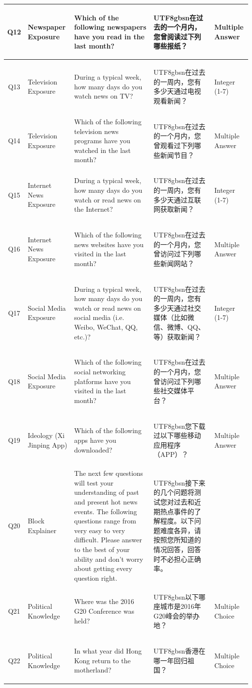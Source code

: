 \documentclass[11pt]{article}
\newcommand{\zh}[1]{\begin{CJK*}{UTF8}{gbsn}#1\end{CJK*}}
\begin{document}
\begin{table}[H]
{\begin{tabular}{|c|p{}|p{}|p{}|p{}|}
        Q12 & Newspaper Exposure & Which of the following newspapers have you read in the last month? & \zh{在过去的一个月内，您曾阅读过下列哪些报纸？} & Multiple Answer \\\hline
        Q13 & Television Exposure & During a typical week, how many days do you watch news on TV? & \zh{在过去的一周内，您有多少天通过电视观看新闻？} & Integer (1-7) \\\hline
        Q14 & Television Exposure & Which of the following television news programs have you watched in the last month? & \zh{在过去的一个月内，您曾观看过下列哪些新闻节目？} & Multiple Answer \\\hline
        Q15 & Internet News Exposure & During a typical week, how many days do you watch or read news on the Internet? & \zh{在过去的一周内，您有多少天通过互联网获取新闻？} & Integer (1-7) \\\hline
        Q16 & Internet News Exposure & Which of the following news websites have you visited in the last month? & \zh{在过去的一个月内，您曾访问过下列哪些新闻网站？} & Multiple Answer \\\hline
        Q17 & Social Media Exposure & During a typical week, how many days do you watch or read news on social media (i.e. Weibo, WeChat, QQ, etc.)? & \zh{在过去的一周内，您有多少天通过社交媒体（比如微信、微博、QQ、等）获取新闻？} & Integer (1-7) \\\hline
        Q18 & Social Media Exposure & Which of the following social networking platforms have you visited in the last month? & \zh{在过去的一个月内，您曾访问过下列哪些社交媒体平台？} & Multiple Answer \\\hline
        Q19 & Ideology (Xi Jinping App) & Which of the following apps have you downloaded? & \zh{您下载过以下哪些移动应用程序（APP）？} & Multiple Answer \\\hline
        Q20 & Block Explainer & The next few questions will test your understanding of past and present hot news events. The following questions range from very easy to very difficult. Please answer to the best of your ability and don't worry about getting every question right. & \zh{接下来的几个问题将测试您对过去和近期热点事件的了解程度。以下问题难度各异，请按照您所知道的情况回答，回答时不必担心正确率。} &  \\\hline
        Q21 & Political Knowledge & Where was the 2016 G20 Conference was held? & \zh{以下哪座城市是2016年G20峰会的举办地？} & Multiple Choice \\\hline
        Q22 & Political Knowledge & In what year did Hong Kong return to the motherland? & \zh{香港在哪一年回归祖国？} & Multiple Choice \\\hline

\end{tabular}}
\end{table}
\end{document}
